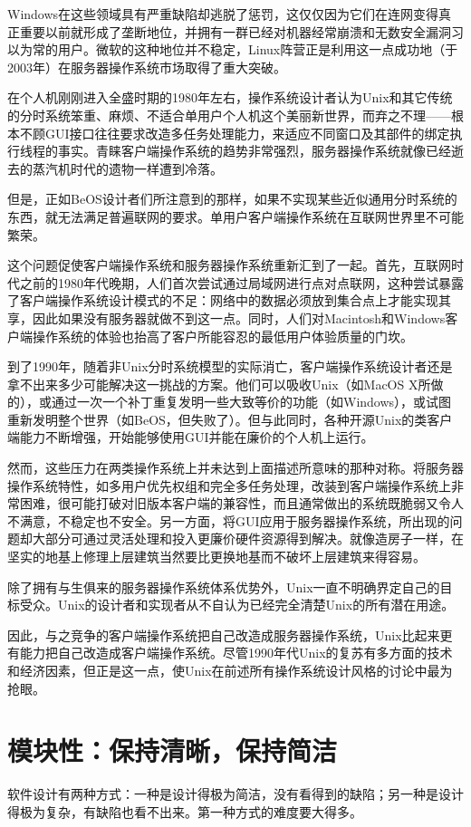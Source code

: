 \documentclass[12pt,oneside]{book}
\begin{document}
\begin{common-format}
Windows在这些领域具有严重缺陷却逃脱了惩罚，这仅仅因为它们在连网变得真正重要以前就形成了垄断地位，并拥有一群已经对机器经常崩溃和无数安全漏洞习以为常的用户。微软的这种地位并不稳定，Linux阵营正是利用这一点成功地（于2003年）在服务器操作系统市场取得了重大突破。

在个人机刚刚进入全盛时期的1980年左右，操作系统设计者认为Unix和其它传统的分时系统笨重、麻烦、不适合单用户个人机这个美丽新世界，而弃之不理——根本不顾GUI接口往往要求改造多任务处理能力，来适应不同窗口及其部件的绑定执行线程的事实。青睐客户端操作系统的趋势非常强烈，服务器操作系统就像已经逝去的蒸汽机时代的遗物一样遭到冷落。

但是，正如BeOS设计者们所注意到的那样，如果不实现某些近似通用分时系统的东西，就无法满足普遍联网的要求。单用户客户端操作系统在互联网世界里不可能繁荣。

这个问题促使客户端操作系统和服务器操作系统重新汇到了一起。首先，互联网时代之前的1980年代晚期，人们首次尝试通过局域网进行点对点联网，这种尝试暴露了客户端操作系统设计模式的不足：网络中的数据必须放到集合点上才能实现其享，因此如果没有服务器就做不到这一点。同时，人们对Macintosh和Windows客户端操作系统的体验也抬高了客户所能容忍的最低用户体验质量的门坎。

到了1990年，随着非Unix分时系统模型的实际消亡，客户端操作系统设计者还是拿不出来多少可能解决这一挑战的方案。他们可以吸收Unix（如MacOS X所做的），或通过一次一个补丁重复发明一些大致等价的功能（如Windows），或试图重新发明整个世界（如BeOS，但失败了）。但与此同时，各种开源Unix的类客户端能力不断增强，开始能够使用GUI并能在廉价的个人机上运行。

然而，这些压力在两类操作系统上并未达到上面描述所意味的那种对称。将服务器操作系统特性，如多用户优先权组和完全多任务处理，改装到客户端操作系统上非常困难，很可能打破对旧版本客户端的兼容性，而且通常做出的系统既脆弱又令人不满意，不稳定也不安全。另一方面，将GUI应用于服务器操作系统，所出现的问题却大部分可通过灵活处理和投入更廉价硬件资源得到解决。就像造房子一样，在坚实的地基上修理上层建筑当然要比更换地基而不破坏上层建筑来得容易。

除了拥有与生俱来的服务器操作系统体系优势外，Unix一直不明确界定自己的目标受众。Unix的设计者和实现者从不自认为已经完全清楚Unix的所有潜在用途。

因此，与之竞争的客户端操作系统把自己改造成服务器操作系统，Unix比起来更有能力把自己改造成客户端操作系统。尽管1990年代Unix的复苏有多方面的技术和经济因素，但正是这一点，使Unix在前述所有操作系统设计风格的讨论中最为抢眼。



\chapter{模块性：保持清晰，保持简洁}
\begin{flushright}
\begin{notecard}{30em}
软件设计有两种方式：一种是设计得极为简洁，没有看得到的缺陷；另一种是设计得极为复杂，有缺陷也看不出来。第一种方式的难度要大得多。


\end{notecard}
\end{flushright}
\end{common-format}
\end{document}
